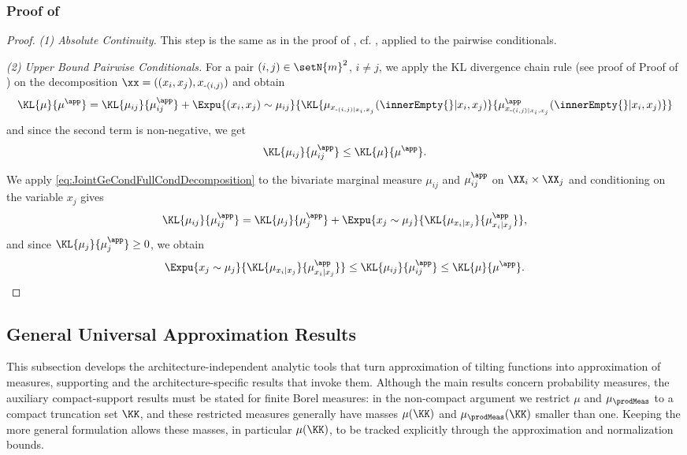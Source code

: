 \documentclass{article}
\begin{document}
\subsubsection{Proof of }
\label{thm:JointVsPairwiseConditionals-PROOF}
\begin{proof}
 \emph{(1) Absolute Continuity.} This step is the same as in
 the proof of , cf.
 , applied to the pairwise
 conditionals.

 \emph{(2) Upper Bound Pairwise Conditionals.} For a pair
 $(i,j) \in \setN{m}^2$, $i\neq j$,
 we apply the KL divergence chain rule
 (see proof of Proof of ) on the decomposition
 $\xx = ((x_i, x_j), x_{\text{-}(i,j)})$ and obtain
 \begin{align*}
  \KL{\mu}{\mu^\app} = \KL{\mu_{ij}}{\mu^\app_{ij}}
  + \Expu{(x_{i}, x_j)\sim \mu_{ij}}{
   \KL{\mu_{x_{\text{-}(i,j)\vert x_{i},x_j}}(\innerEmpty{}\vert x_{i}, x_j)}{
    \mu^\app_{x_{\text{-}(i,j)\vert x_{i},x_j}}(\innerEmpty{}\vert x_{i}, x_j)}
  }
 \end{align*}
 and since the second term is non-negative, we get
 \begin{align*}
  \KL{\mu_{ij}}{\mu^\app_{ij}} \leq \KL{\mu}{\mu^\app}.
 \end{align*}

 We apply \eqref{eq:JointGeCondFullCondDecomposition} to the bivariate
 marginal measure $\mu_{ij}$ and $\mu^\app_{ij}$ on $\XX_i \times \XX_j$ and
 conditioning on the variable $x_j$ gives
 \begin{align*}
  \KL{\mu_{ij}}{\mu^\app_{ij}} = \KL{\mu_j}{\mu^\app_j}
  + \Expu{x_j \sim \mu_j}{\KL{\mu_{x_i\vert x_j}}{\mu^\app_{x_i\vert x_j}}},
 \end{align*}
 and since $ \KL{\mu_j}{\mu^\app_j} \geq 0$, we obtain
 \begin{align*}
  \Expu{x_j \sim \mu_j}{\KL{\mu_{x_i\vert x_j}}{\mu^\app_{x_i\vert x_j}}}
  \leq \KL{\mu_{ij}}{\mu^\app_{ij}} \leq \KL{\mu}{\mu^\app}.
 \end{align*}
\end{proof}
\subsection{General Universal Approximation Results}
This subsection develops the architecture-independent analytic tools
 that turn approximation of tilting functions into approximation of measures,
 supporting  and the architecture-specific
 results that invoke them. Although the main results concern probability
 measures, the auxiliary compact-support results must be stated for finite
 Borel measures: in the non-compact argument we restrict $\mu$ and
 $\mu_\prodMeas$ to a compact truncation set $\KK$, and these restricted
 measures generally have masses $\mu(\KK)$ and $\mu_\prodMeas(\KK)$ smaller
 than one. Keeping the more general formulation allows these masses, in
 particular $\mu(\KK)$, to be tracked explicitly through the approximation and
 normalization bounds.
\end{document}
